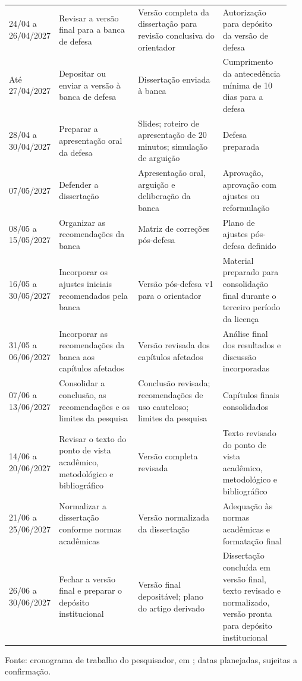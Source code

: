 \begin{landscape}
\begin{longtable}{p{0.12\linewidth}p{0.28\linewidth}p{0.30\linewidth}p{0.24\linewidth}}
24/04 a 26/04/2027 & Revisar a versão final para a banca de defesa & Versão completa da dissertação para revisão conclusiva do orientador & Autorização para depósito da versão de defesa \\
Até 27/04/2027 & Depositar ou enviar a versão à banca de defesa & Dissertação enviada à banca & Cumprimento da antecedência mínima de 10 dias para a defesa \\
28/04 a 30/04/2027 & Preparar a apresentação oral da defesa & Slides; roteiro de apresentação de 20 minutos; simulação de arguição & Defesa preparada \\
07/05/2027 & Defender a dissertação & Apresentação oral, arguição e deliberação da banca & Aprovação, aprovação com ajustes ou reformulação \\
08/05 a 15/05/2027 & Organizar as recomendações da banca & Matriz de correções pós-defesa & Plano de ajustes pós-defesa definido \\
16/05 a 30/05/2027 & Incorporar os ajustes iniciais recomendados pela banca & Versão pós-defesa v1 para o orientador & Material preparado para consolidação final durante o terceiro período da licença \\
31/05 a 06/06/2027 & Incorporar as recomendações da banca aos capítulos afetados & Versão revisada dos capítulos afetados & Análise final dos resultados e discussão incorporadas \\
07/06 a 13/06/2027 & Consolidar a conclusão, as recomendações e os limites da pesquisa & Conclusão revisada; recomendações de uso cauteloso; limites da pesquisa & Capítulos finais consolidados \\
14/06 a 20/06/2027 & Revisar o texto do ponto de vista acadêmico, metodológico e bibliográfico & Versão completa revisada & Texto revisado do ponto de vista acadêmico, metodológico e bibliográfico \\
21/06 a 25/06/2027 & Normalizar a dissertação conforme normas acadêmicas & Versão normalizada da dissertação & Adequação às normas acadêmicas e formatação final \\
26/06 a 30/06/2027 & Fechar a versão final e preparar o depósito institucional & Versão final depositável; plano do artigo derivado & Dissertação concluída em versão final, texto revisado e normalizado, versão pronta para depósito institucional \\
\end{longtable}
\noindent Fonte: cronograma de trabalho do pesquisador, em ; datas planejadas, sujeitas a confirmação.
\endgroup
\end{landscape}
